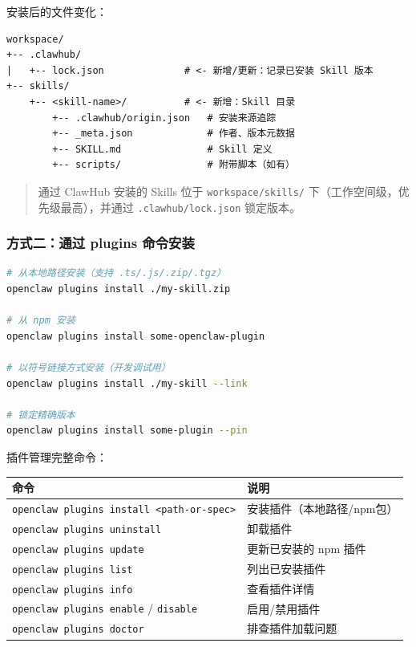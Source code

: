 安装后的文件变化：

\begin{lstlisting}
workspace/
+-- .clawhub/
|   +-- lock.json              # <- 新增/更新：记录已安装 Skill 版本
+-- skills/
    +-- <skill-name>/          # <- 新增：Skill 目录
        +-- .clawhub/origin.json   # 安装来源追踪
        +-- _meta.json             # 作者、版本元数据
        +-- SKILL.md               # Skill 定义
        +-- scripts/               # 附带脚本（如有）
\end{lstlisting}

\begin{quote}
通过 ClawHub 安装的 Skills 位于 \texttt{workspace/skills/} 下（工作空间级，优先级最高），并通过 \texttt{.clawhub/lock.json} 锁定版本。
\end{quote}

\subsubsection{方式二：通过 plugins 命令安装}


\begin{lstlisting}[language=bash]
# 从本地路径安装（支持 .ts/.js/.zip/.tgz）
openclaw plugins install ./my-skill.zip

# 从 npm 安装
openclaw plugins install some-openclaw-plugin

# 以符号链接方式安装（开发调试用）
openclaw plugins install ./my-skill --link

# 锁定精确版本
openclaw plugins install some-plugin --pin
\end{lstlisting}

插件管理完整命令：

\begin{table}[h]
\centering
\small
\begin{tabular}{|l|l|}
\hline
命令 & 说明 \\
\hline
\texttt{openclaw plugins install <path-or-spec>} & 安装插件（本地路径/npm包） \\
\hline
\texttt{openclaw plugins uninstall} & 卸载插件 \\
\hline
\texttt{openclaw plugins update} & 更新已安装的 npm 插件 \\
\hline
\texttt{openclaw plugins list} & 列出已安装插件 \\
\hline
\texttt{openclaw plugins info} & 查看插件详情 \\
\hline
\texttt{openclaw plugins enable} / \texttt{disable} & 启用/禁用插件 \\
\hline
\texttt{openclaw plugins doctor} & 排查插件加载问题 \\
\hline
\end{tabular}
\end{table}

